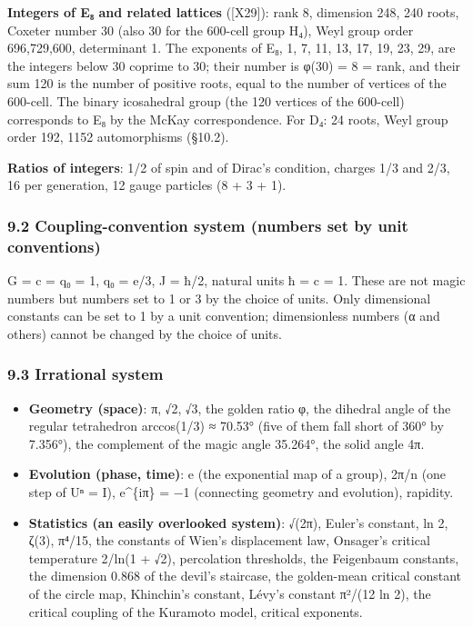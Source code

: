 \documentclass[
  a4paper,
]{article}
\providecommand{\tightlist}{%
  \setlength{\itemsep}{0pt}\setlength{\parskip}{0pt}}
\begin{document}
\textbf{Integers of E₈ and related lattices} ({[}X29{]}): rank 8,
dimension 248, 240 roots, Coxeter number 30 (also 30 for the 600-cell
group H₄), Weyl group order 696,729,600, determinant 1. The exponents of
E₈, 1, 7, 11, 13, 17, 19, 23, 29, are the integers below 30 coprime to
30; their number is φ(30) = 8 = rank, and their sum 120 is the number of
positive roots, equal to the number of vertices of the 600-cell. The
binary icosahedral group (the 120 vertices of the 600-cell) corresponds
to E₈ by the McKay correspondence. For D₄: 24 roots, Weyl group order
192, 1152 automorphisms (§10.2).

\textbf{Ratios of integers}: 1/2 of spin and of Dirac's condition,
charges 1/3 and 2/3, 16 per generation, 12 gauge particles (8 + 3 + 1).

\subsubsection{9.2 Coupling-convention system (numbers set by unit
conventions)}\label{coupling-convention-system-numbers-set-by-unit-conventions}

G = c = q₀ = 1, q₀ = e/3, J = ħ/2, natural units ħ = c = 1. These are
not magic numbers but numbers set to 1 or 3 by the choice of units. Only
dimensional constants can be set to 1 by a unit convention;
dimensionless numbers (α and others) cannot be changed by the choice of
units.

\subsubsection{9.3 Irrational system}\label{irrational-system}

\begin{itemize}
\tightlist
\item
  \textbf{Geometry (space)}: π, √2, √3, the golden ratio φ, the dihedral
  angle of the regular tetrahedron arccos(1/3) ≈ 70.53° (five of them
  fall short of 360° by 7.356°), the complement of the magic angle
  35.264°, the solid angle 4π.
\item
  \textbf{Evolution (phase, time)}: e (the exponential map of a group),
  2π/n (one step of Uⁿ = I), e\^{}\{iπ\} = −1 (connecting geometry and
  evolution), rapidity.
\item
  \textbf{Statistics (an easily overlooked system)}: √(2π), Euler's
  constant, ln 2, ζ(3), π⁴/15, the constants of Wien's displacement law,
  Onsager's critical temperature 2/ln(1 + √2), percolation thresholds,
  the Feigenbaum constants, the dimension 0.868 of the devil's
  staircase, the golden-mean critical constant of the circle map,
  Khinchin's constant, Lévy's constant π²/(12 ln 2), the critical
  coupling of the Kuramoto model, critical exponents.
\end{itemize}
\end{document}
